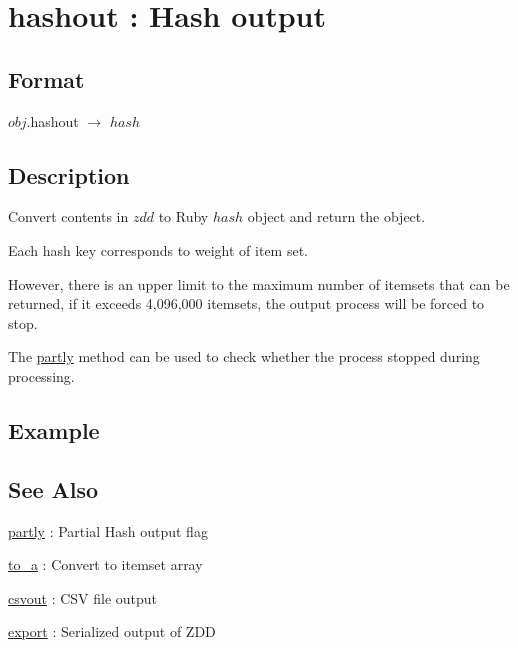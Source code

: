 
\section{hashout : Hash output\label{sect:hashout}}
\subsection*{Format}
$obj$.hashout $\rightarrow$ $hash$

\subsection*{Description}
 Convert contents in $zdd$ to Ruby $hash$ object and return the object. 

 Each hash key corresponds to weight of item set.  

However, there is an upper limit to the maximum number of itemsets that can be returned, if it exceeds 4,096,000 itemsets, the output process will be forced to stop. 

The \hyperref[sect:partly]{partly} method can be used to check whether the process  stopped during processing. 

\subsection*{Example}


\subsection*{See Also}
\hyperref[sect:partly]{partly} : Partial Hash output flag

\hyperref[sect:to_a]{to\_a} : Convert to itemset array

\hyperref[sect:csvout]{csvout} : CSV file output

\hyperref[sect:export]{export} : Serialized output of ZDD

